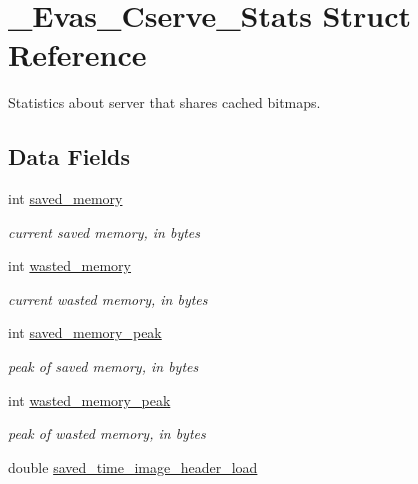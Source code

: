 \section{\_\-Evas\_\-Cserve\_\-Stats Struct Reference}
\label{struct__Evas__Cserve__Stats}


Statistics about server that shares cached bitmaps.  


\subsection*{Data Fields}
\begin{DoxyCompactItemize}
\item 
int \hyperlink{struct__Evas__Cserve__Stats_af7fa72c981c855ee8c0e49dd3395f113}{saved\_\-memory}\label{struct__Evas__Cserve__Stats_af7fa72c981c855ee8c0e49dd3395f113}

\begin{DoxyCompactList}\small\item\em current saved memory, in bytes \item\end{DoxyCompactList}\item 
int \hyperlink{struct__Evas__Cserve__Stats_ab98e8e5dd83545a2c6acc3c914ea488e}{wasted\_\-memory}\label{struct__Evas__Cserve__Stats_ab98e8e5dd83545a2c6acc3c914ea488e}

\begin{DoxyCompactList}\small\item\em current wasted memory, in bytes \item\end{DoxyCompactList}\item 
int \hyperlink{struct__Evas__Cserve__Stats_a9738ab5831d7b402111db096b6ff972b}{saved\_\-memory\_\-peak}\label{struct__Evas__Cserve__Stats_a9738ab5831d7b402111db096b6ff972b}

\begin{DoxyCompactList}\small\item\em peak of saved memory, in bytes \item\end{DoxyCompactList}\item 
int \hyperlink{struct__Evas__Cserve__Stats_afcdf3ed844a2e8241c0ee5986e6532bb}{wasted\_\-memory\_\-peak}\label{struct__Evas__Cserve__Stats_afcdf3ed844a2e8241c0ee5986e6532bb}

\begin{DoxyCompactList}\small\item\em peak of wasted memory, in bytes \item\end{DoxyCompactList}\item 
double \hyperlink{struct__Evas__Cserve__Stats_a35301ae776cdf63793735930d8fe0873}{saved\_\-time\_\-image\_\-header\_\-load}\label{struct__Evas__Cserve__Stats_a35301ae776cdf63793735930d8fe0873}


\end{DoxyCompactItemize}
